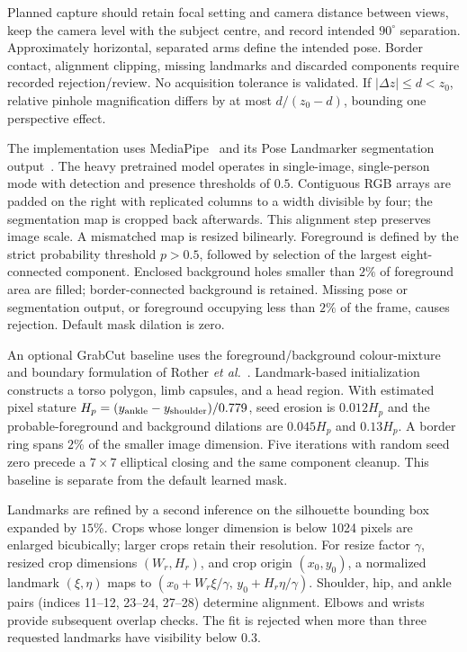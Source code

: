\documentclass[11pt,a4paper]{article}
\begin{document}
Planned capture should retain focal setting and camera distance between views, keep the camera level with the subject centre, and record intended $90^\circ$ separation. Approximately horizontal, separated arms define the intended pose. Border contact, alignment clipping, missing landmarks and discarded components require recorded rejection/review. No acquisition tolerance is validated. If $|\Delta z|\leq d<z_0$, relative pinhole magnification differs by at most $d/(z_0-d)$, bounding one perspective effect.

The implementation uses MediaPipe~\cite{lugaresi2019mediapipe} and its Pose Landmarker segmentation output~\cite{mediapipeguide}. The heavy pretrained model operates in single-image, single-person mode with detection and presence thresholds of $0.5$. Contiguous RGB arrays are padded on the right with replicated columns to a width divisible by four; the segmentation map is cropped back afterwards. This alignment step preserves image scale. A mismatched map is resized bilinearly. Foreground is defined by the strict probability threshold $p>0.5$, followed by selection of the largest eight-connected component. Enclosed background holes smaller than $2\%$ of foreground area are filled; border-connected background is retained. Missing pose or segmentation output, or foreground occupying less than $2\%$ of the frame, causes rejection. Default mask dilation is zero.

An optional GrabCut baseline uses the foreground/background colour-mixture and boundary formulation of Rother \emph{et al.}~\cite{rother2004grabcut}. Landmark-based initialization constructs a torso polygon, limb capsules, and a head region. With estimated pixel stature $H_p=(y_{\rm ankle}-y_{\rm shoulder})/0.779$, seed erosion is $0.012H_p$ and the probable-foreground and background dilations are $0.045H_p$ and $0.13H_p$. A border ring spans $2\%$ of the smaller image dimension. Five iterations with random seed zero precede a $7\times7$ elliptical closing and the same component cleanup. This baseline is separate from the default learned mask.

Landmarks are refined by a second inference on the silhouette bounding box expanded by $15\%$. Crops whose longer dimension is below 1024 pixels are enlarged bicubically; larger crops retain their resolution. For resize factor $\gamma$, resized crop dimensions $(W_r,H_r)$, and crop origin $(x_0,y_0)$, a normalized landmark $(\xi,\eta)$ maps to $(x_0+W_r\xi/\gamma,\,y_0+H_r\eta/\gamma)$. Shoulder, hip, and ankle pairs (indices 11--12, 23--24, 27--28) determine alignment. Elbows and wrists provide subsequent overlap checks. The fit is rejected when more than three requested landmarks have visibility below $0.3$.
\end{document}
